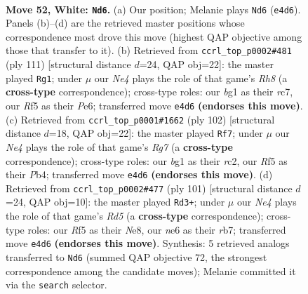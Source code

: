 \documentclass[11pt]{article}
\begin{document}
\clearpage

\begin{figure}[p]\centering
\begin{subfigure}{0.46\textwidth}\centering
\resizebox{\linewidth}{!}{%
\newchessgame
\chessboard[
  setfen={3k4/7r/4n3/5RPp/P3N3/8/6P1/4K1b1 w - - 1 52},
  showmover=false,
  pgfstyle=straightmove, color=movearrow, markmove={e4-d6}
]}
\caption{}
\end{subfigure}\hfill
\begin{subfigure}{0.46\textwidth}\centering
\resizebox{\linewidth}{!}{%
\newchessgame
\chessboard[
  setfen={6k1/2R5/4p1p1/4N3/7p/5K2/8/7r b - - 2 56},
  showmover=false,
  pgfstyle=straightmove, color=movearrow, markmove={h1-g1}
]}
\caption{}
\end{subfigure}
\\[4pt]
\begin{subfigure}{0.46\textwidth}\centering
\resizebox{\linewidth}{!}{%
\newchessgame
\chessboard[
  setfen={8/6R1/8/1p2k1PP/1P6/5n2/2r5/5K2 w - - 3 52},
  showmover=false,
  pgfstyle=straightmove, color=movearrow, markmove={g7-f7}
]}
\caption{}
\end{subfigure}\hfill
\begin{subfigure}{0.46\textwidth}\centering
\resizebox{\linewidth}{!}{%
\newchessgame
\chessboard[
  setfen={4n3/1R4p1/8/7P/k2r4/p6K/B4P2/8 b - - 9 51},
  showmover=false,
  pgfstyle=straightmove, color=movearrow, markmove={d4-d3}
]}
\caption{}
\end{subfigure}
\caption{\textbf{Move 52, White: \texttt{Nd6}.} (a) Our position; Melanie plays \texttt{Nd6} (\texttt{e4d6}). Panels (b)--(d) are the retrieved master positions whose correspondence most drove this move (highest QAP objective among those that transfer to it). (b) Retrieved from \texttt{ccrl\_top\_p0002\#481} (ply 111) [structural distance $d$=24, QAP obj=22]: the master played \texttt{Rg1}; under $\mu$ our \emph{Ne4} plays the role of that game's \emph{Rh8} (a \textbf{cross-type} correspondence); cross-type roles: our \emph{b}g1 as their \emph{r}c7, our \emph{R}f5 as their \emph{P}e6; transferred move \texttt{e4d6} \textbf{(endorses this move)}. (c) Retrieved from \texttt{ccrl\_top\_p0001\#1662} (ply 102) [structural distance $d$=18, QAP obj=22]: the master played \texttt{Rf7}; under $\mu$ our \emph{Ne4} plays the role of that game's \emph{Rg7} (a \textbf{cross-type} correspondence); cross-type roles: our \emph{b}g1 as their \emph{r}c2, our \emph{R}f5 as their \emph{P}b4; transferred move \texttt{e4d6} \textbf{(endorses this move)}. (d) Retrieved from \texttt{ccrl\_top\_p0002\#477} (ply 101) [structural distance $d$=24, QAP obj=10]: the master played \texttt{Rd3+}; under $\mu$ our \emph{Ne4} plays the role of that game's \emph{Rd5} (a \textbf{cross-type} correspondence); cross-type roles: our \emph{R}f5 as their \emph{N}e8, our \emph{n}e6 as their \emph{r}b7; transferred move \texttt{e4d6} \textbf{(endorses this move)}. Synthesis: 5 retrieved analogs transferred to \texttt{Nd6} (summed QAP objective 72, the strongest correspondence among the candidate moves); Melanie committed it via the \texttt{search} selector.}
\label{fig:thought-m102}
\end{figure}
\end{document}
